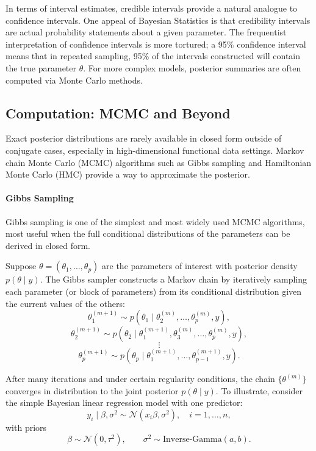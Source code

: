 In terms of interval estimates, credible intervals provide a natural analogue to confidence intervals. 
One appeal of Bayesian Statistics is that credibility intervals are actual probability statements about a given parameter.  The frequentist interpretation of confidence intervals is more tortured; a 95\% confidence interval means that in repeated sampling, 95\% of the intervals constructed will contain the true parameter \(\theta\)\cite{wackerly_mathematical_2008}.  For more complex models, posterior summaries are often computed via Monte Carlo methods.

\subsection{Computation: MCMC and Beyond}
Exact posterior distributions are rarely available in closed form outside of conjugate cases, especially in high-dimensional functional data settings.  
Markov chain Monte Carlo (MCMC) algorithms such as Gibbs sampling and Hamiltonian Monte Carlo (HMC) provide a way to approximate the posterior.

\paragraph{Gibbs Sampling}
Gibbs sampling is one of the simplest and most widely used MCMC algorithms, most useful when the full conditional distributions of the parameters can be derived in closed form.

Suppose $\theta = (\theta_1, \ldots, \theta_p)$ are the parameters of interest
with posterior density $p(\theta \mid y)$. The Gibbs sampler constructs a Markov
chain by iteratively sampling each parameter (or block of parameters) from its
conditional distribution given the current values of the others:
\[
\theta_1^{(m+1)} \sim p(\theta_1 \mid \theta_2^{(m)}, \ldots, \theta_p^{(m)}, y),
\]
\[
\theta_2^{(m+1)} \sim p(\theta_2 \mid \theta_1^{(m+1)}, \theta_3^{(m)}, \ldots, \theta_p^{(m)}, y),
\]
\[
\vdots
\]
\[
\theta_p^{(m+1)} \sim p(\theta_p \mid \theta_1^{(m+1)}, \ldots, \theta_{p-1}^{(m+1)}, y).
\]

After many iterations and under certain regularity conditions, the chain $\{\theta^{(m)}\}$ converges in distribution to the joint posterior $p(\theta \mid y)$\cite{gelman_bayesian_2013}.  
To illustrate, consider the simple Bayesian linear regression model with one predictor:
\[
y_i \mid \beta, \sigma^2 \sim \mathcal N(x_i \beta, \sigma^2), 
\quad i=1,\dots,n,
\]
with priors
\[
\beta \sim \mathcal N(0, \tau^2),
\qquad
\sigma^2 \sim \mathrm{Inverse\text{-}Gamma}(a,b).
\]


